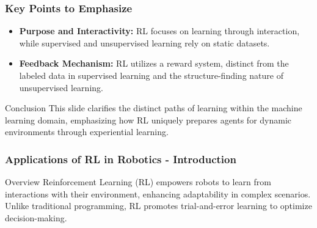 \documentclass[aspectratio=169]{beamer}
\begin{document}
\begin{frame}[fragile]
    \frametitle{Key Points to Emphasize}
    \begin{itemize}
        \item \textbf{Purpose and Interactivity:} RL focuses on learning through interaction, while supervised and unsupervised learning rely on static datasets.
        \item \textbf{Feedback Mechanism:} RL utilizes a reward system, distinct from the labeled data in supervised learning and the structure-finding nature of unsupervised learning.
    \end{itemize}
    \begin{block}{Conclusion}
        This slide clarifies the distinct paths of learning within the machine learning domain, emphasizing how RL uniquely prepares agents for dynamic environments through experiential learning.
    \end{block}
\end{frame}

\begin{frame}[fragile]
    \frametitle{Applications of RL in Robotics - Introduction}
    \begin{block}{Overview}
        Reinforcement Learning (RL) empowers robots to learn from interactions with their environment, enhancing adaptability in complex scenarios. Unlike traditional programming, RL promotes trial-and-error learning to optimize decision-making.
    \end{block}
\end{frame}
\end{document}
